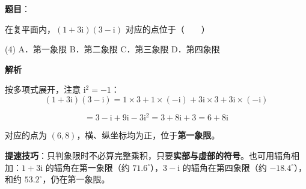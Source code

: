 \begin{answer}

\textbf{题目}：

在复平面内，$(1+3\mathrm i)(3-\mathrm i)$ 对应的点位于\mbox{（　　）}

\begin{gkopts}(4)
\task A．第一象限
\task B．第二象限
\task C．第三象限
\task D．第四象限
\end{gkopts}

\textbf{解析}

按多项式展开，注意 $\mathrm i^{2}=-1$：
\nopagebreak[4]
\[(1+3\mathrm i)(3-\mathrm i)=1\times3+1\times(-\mathrm i)+3\mathrm i\times3+3\mathrm i\times(-\mathrm i)\]

\nopagebreak[4]
\[=3-\mathrm i+9\mathrm i-3\mathrm i^{2}=3+8\mathrm i+3=6+8\mathrm i\]

对应的点为 $(6,8)$，横、纵坐标均为正，位于\textbf{第一象限}。

\begin{gktip}
\textbf{提速技巧}：只判象限时不必算完整乘积，只要\textbf{实部与虚部的符号}。也可用辐角相加：$1+3\mathrm i$ 的辐角在第一象限（约 $71.6^\circ$），$3-\mathrm i$ 的辐角在第四象限（约 $-18.4^\circ$），和约 $53.2^\circ$，仍在第一象限。
\end{gktip}


\par\medskip

\end{answer}
